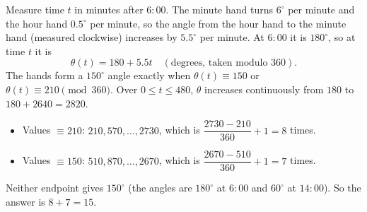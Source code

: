 Measure time $t$ in minutes after $6{:}00$. The minute hand turns $6^\circ$ per minute and the hour hand $0.5^\circ$ per minute, so the angle from the hour hand to the minute hand (measured clockwise) increases by $5.5^\circ$ per minute. At $6{:}00$ it is $180^\circ$, so at time $t$ it is
\[
\theta(t)=180+5.5t\quad(\text{degrees, taken modulo }360).
\]
The hands form a $150^\circ$ angle exactly when $\theta(t)\equiv150$ or $\theta(t)\equiv210\pmod{360}$. Over $0\le t\le480$, $\theta$ increases continuously from $180$ to $180+2640=2820$.
\begin{itemize}
\item Values $\equiv210$: $210,570,\dots,2730$, which is $\dfrac{2730-210}{360}+1=8$ times.
\item Values $\equiv150$: $510,870,\dots,2670$, which is $\dfrac{2670-510}{360}+1=7$ times.
\end{itemize}
Neither endpoint gives $150^\circ$ (the angles are $180^\circ$ at $6{:}00$ and $60^\circ$ at $14{:}00$). So the answer is $8+7=\boxed{15}$.
